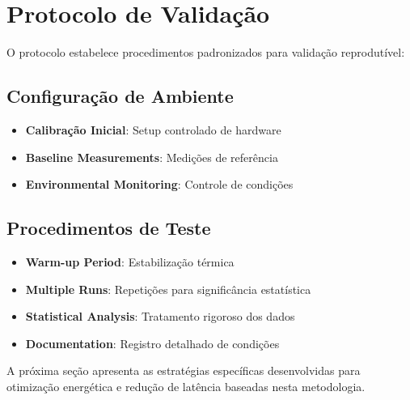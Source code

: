 \section{Protocolo de Validação}\label{sec:protocolo_validacao}

O protocolo estabelece procedimentos padronizados para validação reprodutível:

\subsection{Configuração de Ambiente}
\begin{itemize}
    \item \textbf{Calibração Inicial}: Setup controlado de hardware
    \item \textbf{Baseline Measurements}: Medições de referência
    \item \textbf{Environmental Monitoring}: Controle de condições
\end{itemize}

\subsection{Procedimentos de Teste}
\begin{itemize}
    \item \textbf{Warm-up Period}: Estabilização térmica
    \item \textbf{Multiple Runs}: Repetições para significância estatística
    \item \textbf{Statistical Analysis}: Tratamento rigoroso dos dados
    \item \textbf{Documentation}: Registro detalhado de condições
\end{itemize}

A próxima seção apresenta as estratégias específicas desenvolvidas para otimização energética e redução de latência baseadas nesta metodologia.
